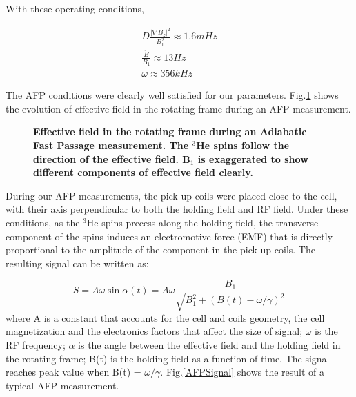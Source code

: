 With these operating conditions, 

\begin{subequations}
	\begin{gather}
	D\frac{|\nabla B_{z}|^{2}}{B_{1}^{2}} \approx 1.6mHz\\
	\frac{\dot B}{B_{1}} \approx 13Hz\\
	\omega \approx 356kHz
	\end{gather}
\end{subequations}

The AFP conditions were clearly well satisfied for our parameters. Fig.\ref{AFP} shows the evolution of effective field in the rotating frame during an AFP measurement.

\begin{figure}[H]
	\centering
	\caption{{\bf Effective field in the rotating frame during an Adiabatic Fast Passage measurement. The $^{3}$He spins follow the direction of the effective field. B$_{1}$ is exaggerated to show different components of effective field clearly.}}
	\label{AFP}
\end{figure}

During our AFP measurements, the pick up coils were placed close to the cell, with their axis perpendicular to both the holding field and RF field. Under these conditions, as the $^{3}$He spins precess along the holding field, the transverse component of the spins induces an electromotive force (EMF) that is directly proportional to the amplitude of the component in the pick up coils. The resulting signal can be written as:

\begin{equation}
S=A\omega \sin{\alpha(t)}=A\omega \frac{B_{1}}{\sqrt{B_{1}^{2}+(B(t)-\omega/\gamma)^{2}}}
\end{equation}
where A is a constant that accounts for the cell and coils geometry, the cell magnetization and the electronics factors that affect the size of signal; $\omega$ is the RF frequency; $\alpha$ is the angle between the effective field and the holding field in the rotating frame; B(t) is the holding field as a function of time. The signal reaches peak value when B(t) = $\omega/\gamma$. Fig.\ref{AFPSignal} shows the result of a typical AFP measurement.

